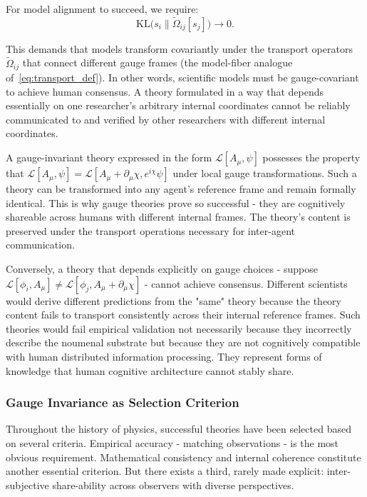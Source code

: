 \documentclass[11pt]{article}
\begin{document}
For model alignment to succeed, we require:
\begin{equation}
\mathrm{KL}\big(s_i \| \tilde{\Omega}_{ij}[s_j]\big) \to 0.
\end{equation}

This demands that models transform covariantly under the transport operators $\tilde{\Omega}_{ij}$ that connect different gauge frames (the model-fiber analogue of~\eqref{eq:transport_def}). In other words, scientific models must be gauge-covariant to achieve human consensus. A theory formulated in a way that depends essentially on one researcher's arbitrary internal coordinates cannot be reliably communicated to and verified by other researchers with different internal coordinates.

A gauge-invariant theory expressed in the form $\mathcal{L}[A_\mu, \psi]$ possesses the property that $\mathcal{L}[A_\mu, \psi] = \mathcal{L}[A_\mu + \partial_\mu\chi, e^{i\chi}\psi]$ under local gauge transformations. Such a theory can be transformed into any agent's reference frame and remain formally identical. This is why gauge theories prove so successful - they are cognitively shareable across humans with different internal frames. The theory's content is preserved under the transport operations necessary for inter-agent communication.

Conversely, a theory that depends explicitly on gauge choices - suppose $\mathcal{L}[\phi_i, A_\mu] \neq \mathcal{L}[\phi_j, A_\mu + \partial_\mu\chi]$ - cannot achieve consensus. Different scientists would derive different predictions from the "same" theory because the theory content fails to transport consistently across their internal reference frames. Such theories would fail empirical validation not necessarily because they incorrectly describe the noumenal substrate but because they are not cognitively compatible with human distributed information processing. They represent forms of knowledge that human cognitive architecture cannot stably share.

\subsubsection{Gauge Invariance as Selection Criterion}

Throughout the history of physics, successful theories have been selected based on several criteria. Empirical accuracy - matching observations - is the most obvious requirement. Mathematical consistency and internal coherence constitute another essential criterion. But there exists a third, rarely made explicit: inter-subjective share-ability across observers with diverse perspectives.
\end{document}
